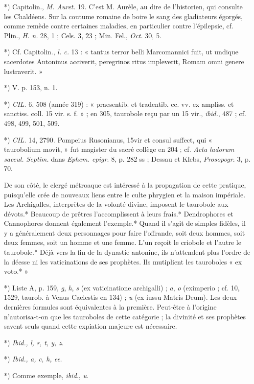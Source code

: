 \documentclass[a4paper, 11pt, oneside, polutonikogreek, french]{article}
\begin{document}
*) Capitolin., \emph{M. Auret.} 19. C'est M. Aurèle, au dire de l'historien, qui consulte les Chaldéens. Sur la coutume romaine de boire le sang des gladiateurs égorgés, comme remède contre certaines maladies, en particulier contre l'épilepsie, cf. Plin., \emph{H. n.} 28, 1 ; Cels. 3, 23 ; Min. Fel., \emph{Oct.} 30, 5.

*) Cf. Capitolin., \emph{l. c.} 13 : « tantus terror belli Marcomannici fuit, ut undique sacerdotes Antoninus acciverit, peregrinos ritus impleverit, Romam omni genere lustraverit. »

*) V. p. 153, n. 1.

*) \emph{CIL.} 6, 508 (année 319) : « praesentib. et tradentib. cc. vv. ex ampliss. et sanctiss. coll. 15 vir. s. f. » ; en 305, taurobole reçu par un 15 vir., \emph{ibid.}, 487 ; cf. 498, 499, 501, 509.

*) \emph{CIL.} 14, 2790. Pompeius Rusonianus, 15vir et consul suffect, qui « taurobolium movit, » fut magister du sacré collège en 204 ; cf. \emph{Acta ludorum saecul. Septim.} dans \emph{Ephem. epigr.} 8, p. 282 ss ; Dessau et Klebs, \emph{Prosopogr.} 3, p. 70.

De son côté, le clergé métroaque est intéressé à la propagation de cette pratique, puisqu'elle crée de nouveaux liens entre le culte phrygien et la maison impériale. Les Archigalles, interprètes de la volonté divine, imposent le taurobole aux dévots.* Beaucoup de prêtres l'accomplissent à leurs frais.* Dendrophores et Cannophores donnent également l'exemple.* Quand il s'agit de simples fidèles, il y a généralement deux personnages pour faire l'offrande, soit deux hommes, soit deux femmes, soit un homme et une femme. L'un reçoit le criobole et l'autre le taurobole.* Déjà vers la fin de la dynastie antonine, ils n'attendent plus l'ordre de la déesse ni les vaticinations de ses prophètes. Ils mutiplient les tauroboles « ex voto.* »

*) Liste A, p. 159, \emph{g}, \emph{h}, \emph{s} (ex vaticinatione archigalli) ; \emph{a}, \emph{o} (eximperio ; cf. 10, 1529, taurob. à Venus Caelestis en 134) ; \emph{u} (ex iussu Matris Deum). Les deux dernières formules sont équivalentes à la première. Peut-être à l'origine n'autorisa-t-on que les tauroboles de cette catégorie ; la divinité et ses prophètes savent seuls quand cette expiation majeure est nécessaire.

*) \emph{Ibid., l, r, t, y, z}.

*) \emph{Ibid., a, c, h, ee}.

*) Comme exemple, \emph{ibid.}, \emph{u}.
\end{document}
